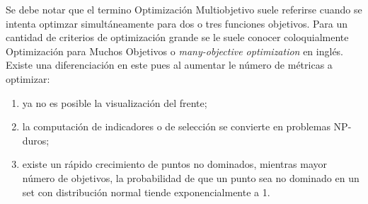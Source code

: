 Se debe notar que el termino Optimizaci\'on Multiobjetivo suele referirse cuando se intenta optimzar simult\'aneamente para dos o tres funciones objetivos. Para un cantidad de criterios de optimizaci\'on grande se le suele conocer coloquialmente Optimizaci\'on para Muchos Objetivos o \textit{many-objective optimization} en ingl\'es. Existe una diferenciaci\'on en este pues al aumentar le n\'umero de m\'etricas a optimizar:
\begin{enumerate}
    \item ya no es posible la visualizaci\'on del frente;
    \item la computaci\'on de indicadores o de selecci\'on se convierte en problemas NP-duros;
    \item existe un r\'apido crecimiento de puntos no dominados, mientras mayor n\'umero de objetivos, la probabilidad de que un punto sea no dominado en un set con distribuci\'on normal tiende exponencialmente a 1.
\end{enumerate}


